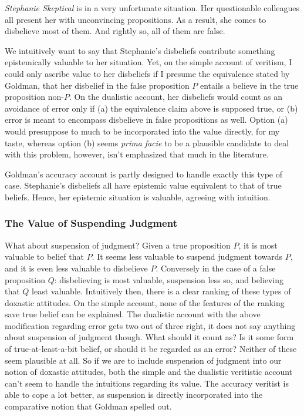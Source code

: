 \documentclass[12pt,numbers=noenddot]{scrartcl}
\begin{document}
\begin{description}
   \item \emph{Stephanie Skeptical} is in a very unfortunate situation. Her questionable colleagues all present her with unconvincing propositions. As a result, she comes to disbelieve most of them. And rightly so, all of them are false.
\end{description}

We intuitively want to say that Stephanie's disbeliefs contribute something epistemically valuable to her situation. Yet, on the simple account of veritism, I could only ascribe value to her disbeliefs if I presume the equivalence stated by Goldman, that her disbelief in the false proposition $P$ entails a believe in the true proposition non-$P$. On the dualistic account, her disbeliefs would count as an avoidance of error only if (a) the equivalence claim above is supposed true, or (b) error is meant to encompass disbelieve in false propositions as well. Option (a) would presuppose to much to be incorporated into the value directly, for my taste, whereas option (b) seems \emph{prima facie} to be a plausible candidate to deal with this problem, however, isn't emphasized that much in the literature.

Goldman's accuracy account is partly designed to handle exactly this type of case. Stephanie's disbeliefs all have epistemic value equivalent to that of true beliefs. Hence, her epistemic situation is valuable, agreeing with intuition.

\subsubsection{The Value of Suspending Judgment}

What about suspension of judgment? Given a true proposition $P$, it is most valuable to belief that $P$. It seems less valuable to suspend judgment towards $P$, and it is even less valuable to disbelieve $P$. Conversely in the case of a false proposition $Q$: disbelieving is most valuable, suspension less so, and believing that $Q$ least valuable. Intuitively then, there is a clear ranking of these types of doxastic attitudes. On the simple account, none of the features of the ranking save true belief can be explained. The dualistic account with the above modification regarding error gets two out of three right, it does not say anything about suspension of judgment though. What should it count as? Is it some form of true-at-least-a-bit belief, or should it be regarded as an error? Neither of these seem plausible at all. So if we are to include suspension of judgment into our notion of doxastic attitudes, both the simple and the dualistic veritistic account can't seem to handle the intuitions regarding its value. The accuracy veritist is able to cope a lot better, as suspension is directly incorporated into the comparative notion that Goldman spelled out.
\end{document}
